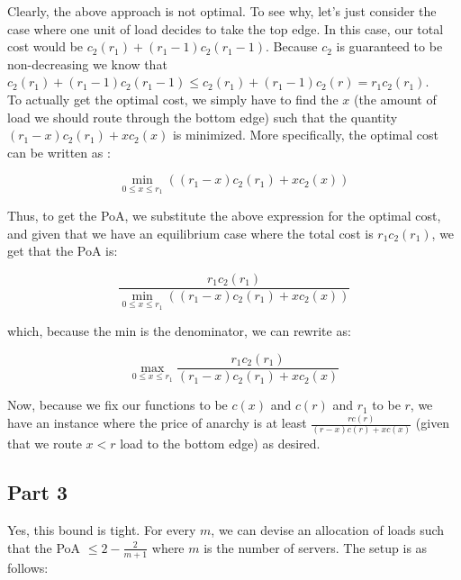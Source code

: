 \documentclass[12 pt]{article}
\begin{document}
	\noindent Clearly, the above approach is not optimal. To see why, let's just consider the case where one unit of load decides to take the top edge. In this case, our total cost would be $c_2(r_1) + (r_1 - 1) c_2(r_1 - 1)$. Because $c_2$ is guaranteed to be non-decreasing we know that $c_2(r_1) + (r_1 - 1) c_2(r_1 - 1) \leq c_2(r_1) + (r_1 - 1) c_2(r) = r_1c_2(r_1)$. \\
	
	\noindent To actually get the optimal cost, we simply have to find the $x$ (the amount of load we should route through the bottom edge) such that the quantity $(r_1 - x) c_2(r_1) + x c_2(x)$ is minimized. More specifically, the optimal cost can be written as :
	
	\[
	\min_{0 \leq x \leq r_1} ((r_1 - x) c_2(r_1) + x c_2(x))
	\] 
	
	\noindent Thus, to get the PoA, we substitute the above expression for the optimal cost, and given that we have an equilibrium case where the total cost is $r_1c_2(r_1)$, we get that the PoA is: 
	
	\[
	\frac{r_1c_2(r_1)}{\min_{0 \leq x \leq r_1} ((r_1 - x) c_2(r_1) + x c_2(x))}
	\]
	
	\noindent which, because the min is the denominator, we can rewrite as:
	
	\[
	\max_{0 \leq x \leq r_1}\frac{r_1c_2(r_1)}{(r_1 - x) c_2(r_1) + x c_2(x)}
	\]
	
	\noindent Now, because we fix our functions to be $c(x)$ and $c(r)$ and $r_1$ to be $r$, we have an instance where the price of anarchy is at least $\frac{rc(r)}{(r - x) c(r) + x c(x)}$ (given that we route $x < r$ load to the bottom edge) as desired.\\

	
	\subsection*{Part 3}
	
	\noindent Yes, this bound is tight. For every $m$, we can devise an allocation of loads such that the PoA $\leq 2 - \frac{2}{m+1}$ where $m$ is the number of servers. The setup is as follows:
	
\end{document}
